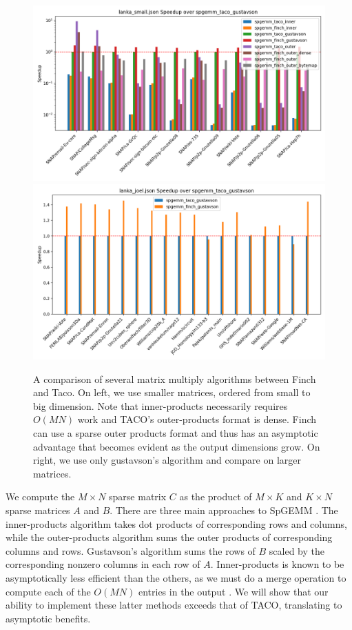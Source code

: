 \begin{figure}[b]
	\includegraphics[width=0.5\linewidth]{spgemm_small_speedup_log_scale.png}%
	\includegraphics[width=0.5\linewidth]{spgemm_joel_speedup.png}
    \vspace{-8pt}
    \caption{A comparison of several matrix multiply algorithms between
    Finch and Taco. On left, we use smaller matrices, ordered from small to big
    dimension. Note that inner-products necessarily requires $O(MN)$ work and
    TACO's outer-products format is dense. Finch can use a sparse outer products
    format and thus has an asymptotic advantage that becomes evident as the
    output dimensions grow. On right, we use only gustavson's algorithm and
    compare on larger matrices.}
    \label{fig:spgemm}
    \vspace{-12pt}
\end{figure}


We compute the $M \times N$ sparse matrix $C$ as the product of $M \times K$ and $K \times N$ sparse matrices $A$ and $B$.
%
There are three main approaches to SpGEMM \cite[Section 2.2]{zhang2021gamma}.
%
The inner-products algorithm takes dot products of corresponding rows and columns, while the outer-products algorithm sums the outer products of corresponding columns and rows.
%
Gustavson's algorithm sums the rows of $B$ scaled by the corresponding nonzero columns in each row of $A$.
%
Inner-products is known to be asymptotically less efficient than the others, as we must do a merge operation to compute each of the $O(MN)$ entries in the output \cite{ahrens2022autoscheduling}.
%
We will show that our ability to implement these latter methods exceeds that of TACO, translating to asymptotic benefits. 
% 

